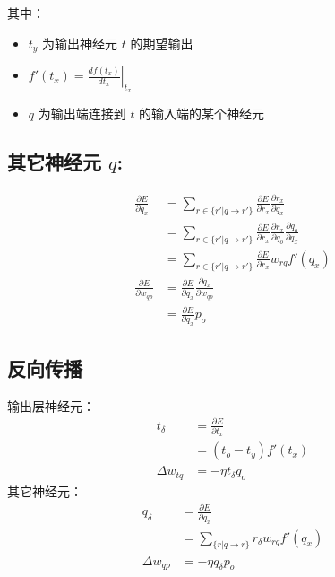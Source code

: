 \documentclass{article}
\begin{document}
其中：
\begin{itemize}
	\item $t_y$ 为输出神经元 $t$ 的期望输出
	\item $f'(t_x)=\left.\frac{df(t_x)}{dt_x}\right|_{t_x}$
	\item $q$ 为输出端连接到 $t$ 的输入端的某个神经元
\end{itemize}


\subsection{其它神经元 $q$:}
\begin{align*}
\frac{\partial E}{\partial q_x}&=\sum_{r\in\{r'|q\rightarrow r'\}}\frac{\partial E}{\partial r_x}\frac{\partial r_x}{\partial q_x}\\
&=\sum_{r\in\{r'|q\rightarrow r'\}}\frac{\partial E}{\partial r_x}\frac{\partial r_x}{\partial q_o}\frac{\partial q_o}{\partial q_x} \\
&=\sum_{r\in\{r'|q\rightarrow r'\}}\frac{\partial E}{\partial r_x}w_{rq}f'(q_x) \\
\frac{\partial E}{\partial w_{qp}} &=\frac{\partial E}{\partial q_x}\frac{\partial q_x}{\partial w_{qp}} \\
&=\frac{\partial E}{\partial q_x}p_o
\end{align*}

\subsection{反向传播}
输出层神经元：
\begin{align*}
t_{\delta}&=\frac{\partial E}{\partial t_x}\\
&=(t_o-t_y) f'(t_x)\\
\Delta w_{tq}&=-\eta t_{\delta}q_o
\end{align*}
其它神经元：
\begin{align*}
q_{\delta}&=\frac{\partial E}{\partial q_x}\\
&=\sum_{\{r|q\rightarrow r\}}r_{\delta}w_{rq}f'(q_x)\\
\Delta w_{qp}&=-\eta q_{\delta}p_o
\end{align*}
\end{document}
